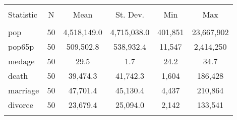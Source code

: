 
\begin{tabular}{@{\extracolsep{5pt}}lccccc} 
\\[-1.8ex]\hline 
\hline \\[-1.8ex] 
Statistic & \multicolumn{1}{c}{N} & \multicolumn{1}{c}{Mean} & \multicolumn{1}{c}{St. Dev.} & \multicolumn{1}{c}{Min} & \multicolumn{1}{c}{Max} \\ 
\hline \\[-1.8ex] 
pop & 50 & 4,518,149.0 & 4,715,038.0 & 401,851 & 23,667,902 \\ 
pop65p & 50 & 509,502.8 & 538,932.4 & 11,547 & 2,414,250 \\ 
medage & 50 & 29.5 & 1.7 & 24.2 & 34.7 \\ 
death & 50 & 39,474.3 & 41,742.3 & 1,604 & 186,428 \\ 
marriage & 50 & 47,701.4 & 45,130.4 & 4,437 & 210,864 \\ 
divorce & 50 & 23,679.4 & 25,094.0 & 2,142 & 133,541 \\ 
\hline \\[-1.8ex] 
\end{tabular} 
